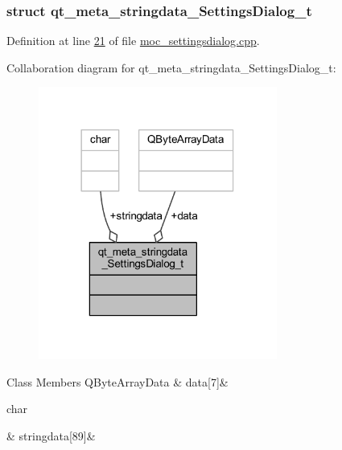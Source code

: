 \subsubsection{struct qt\+\_\+meta\+\_\+stringdata\+\_\+\+Settings\+Dialog\+\_\+t}


Definition at line \hyperlink{a00018_source_l00021}{21} of file \hyperlink{a00018_source}{moc\+\_\+settingsdialog.\+cpp}.



Collaboration diagram for qt\+\_\+meta\+\_\+stringdata\+\_\+\+Settings\+Dialog\+\_\+t\+:
\nopagebreak
\begin{figure}[H]
\begin{center}
\leavevmode
\includegraphics[width=222pt]{d9/dd0/a00191}
\end{center}
\end{figure}
\begin{DoxyFields}{Class Members}
\hypertarget{a00018_a320edc752a589bd0171189d51579680e}{Q\+Byte\+Array\+Data}\label{a00018_a320edc752a589bd0171189d51579680e}
&
data\mbox{[}7\mbox{]}&
\\
\hline

\hypertarget{a00018_ab803985b8fecb8e67a35ab5a3939845b}{char}\label{a00018_ab803985b8fecb8e67a35ab5a3939845b}
&
stringdata\mbox{[}89\mbox{]}&
\\
\hline

\end{DoxyFields}


